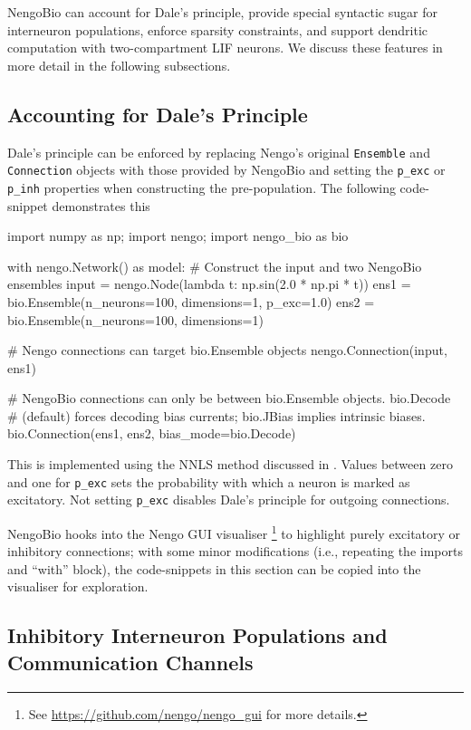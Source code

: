 NengoBio can account for Dale's principle, provide special syntactic sugar for interneuron populations, enforce sparsity constraints, and support dendritic computation with two-compartment LIF neurons.
We discuss these features in more detail in the following subsections.

\subsection{Accounting for Dale's Principle}

Dale's principle can be enforced by replacing Nengo's original \texttt{Ensemble} and \texttt{Connection} objects with those provided by NengoBio and setting the \texttt{p\_exc} or \texttt{p\_inh} properties when constructing the pre-population.
The following code-snippet demonstrates this
\begin{pythoncode}
import numpy as np; import nengo; import nengo_bio as bio

with nengo.Network() as model:
	# Construct the input and two NengoBio ensembles
    input = nengo.Node(lambda t: np.sin(2.0 * np.pi * t))
    ens1 = bio.Ensemble(n_neurons=100, dimensions=1, p_exc=1.0)
    ens2 = bio.Ensemble(n_neurons=100, dimensions=1)

	# Nengo connections can target bio.Ensemble objects
    nengo.Connection(input, ens1)

	# NengoBio connections can only be between bio.Ensemble objects. bio.Decode
	# (default) forces decoding bias currents; bio.JBias implies intrinsic biases.
    bio.Connection(ens1, ens2, bias_mode=bio.Decode)
\end{pythoncode}
This is implemented using the NNLS method discussed in .
Values between zero and one for \texttt{p\_exc} sets the probability with which a neuron is marked as excitatory.
Not setting \texttt{p\_exc} disables Dale's principle for outgoing connections.

NengoBio hooks into the Nengo GUI visualiser%
\footnote{See \url{https://github.com/nengo/nengo_gui} for more details.}
to highlight purely excitatory or inhibitory connections; with some minor modifications (i.e., repeating the imports and \enquote{with} block), the code-snippets in this section can be copied into the visualiser for exploration.

\subsection{Inhibitory Interneuron Populations and Communication Channels}
\label{sec:nengo_bio_inhibitory}

